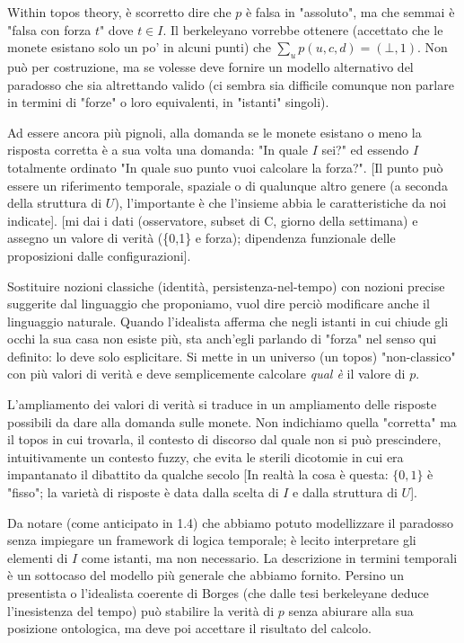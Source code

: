 Within topos theory, è scorretto dire che $p$ è falsa in "assoluto", ma che semmai è "falsa con forza $t$" dove $t \in I$. Il berkeleyano vorrebbe ottenere (accettato che le monete esistano solo un po' in alcuni punti) che $\sum_u p(u,c,d) = (\bot,1)$. Non può per costruzione, ma se volesse deve fornire un modello alternativo del paradosso che sia altrettando valido (ci sembra sia difficile comunque non parlare in termini di "forze" o loro equivalenti, in "istanti" singoli).  

Ad essere ancora più pignoli, alla domanda se le monete esistano o meno la risposta corretta è a sua volta una domanda: "In quale $I$ sei?" ed essendo $I$ totalmente ordinato "In quale suo punto vuoi calcolare la forza?". [Il punto può essere un riferimento temporale, spaziale o di qualunque altro genere (a seconda della struttura di $U$), l'importante è che l'insieme abbia le caratteristiche da noi indicate]. [mi dai i dati (osservatore, subset di C, giorno della settimana) e assegno un valore di verità (\{0,1\} e forza); dipendenza funzionale delle proposizioni dalle configurazioni]. 

Sostituire nozioni classiche (identità, persistenza-nel-tempo) con nozioni precise suggerite dal linguaggio che proponiamo, vuol dire perciò modificare anche il linguaggio naturale. Quando l'idealista afferma che negli istanti in cui chiude gli occhi la sua casa non esiste più, sta anch'egli parlando di "forza" nel senso qui definito: lo deve solo esplicitare. Si mette in un universo (un topos) "non-classico" con più valori di verità e deve semplicemente calcolare \emph{qual è} il valore di $p$. 

L'ampliamento dei valori di verità si traduce in un ampliamento delle risposte possibili da dare alla domanda sulle monete. Non indichiamo quella "corretta" ma il topos in cui trovarla, il contesto di discorso dal quale non si può prescindere, intuitivamente un contesto fuzzy, che evita le sterili dicotomie in cui era impantanato il dibattito da qualche secolo [In realtà la cosa è questa: $\{0,1\}$ è "fisso"; la varietà di risposte è data dalla scelta di $I$ e dalla struttura di $U$].

Da notare (come anticipato in 1.4) che abbiamo potuto modellizzare il paradosso senza impiegare un framework di logica temporale; è lecito interpretare gli elementi di $I$ come istanti, ma non necessario. La descrizione in termini temporali è un sottocaso del modello più generale che abbiamo fornito. Persino un presentista o l'idealista coerente di Borges (che dalle tesi berkeleyane deduce l'inesistenza del tempo) può stabilire la verità di $p$ senza abiurare alla sua posizione ontologica, ma deve poi accettare il risultato del calcolo. 

